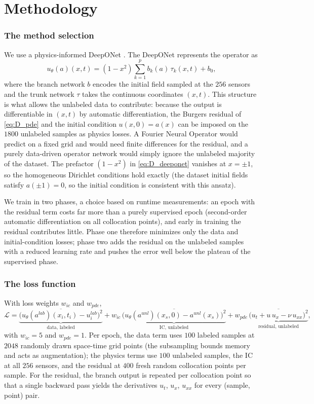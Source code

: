 \section{Methodology}
%
\subsubsection{The method selection}
We use a physics-informed DeepONet \cite{lu2021deeponet, wang2021pideeponet}.
The DeepONet represents the operator as
\begin{equation}
    u_\theta(a)(x,t) = (1 - x^2) \sum_{k=1}^{p} b_k(a)\,\tau_k(x,t) + b_0,
    \label{eq:D_deeponet}
\end{equation}
where the branch network $b$ encodes the initial field sampled at the $256$
sensors and the trunk network $\tau$ takes the continuous coordinates
$(x,t)$. This structure is what allows the unlabeled data to contribute:
because the output is differentiable in $(x,t)$ by automatic
differentiation, the Burgers residual of \eqref{eq:D_pde} and the initial
condition $u(x,0) = a(x)$ can be imposed on the $1800$ unlabeled samples as
physics losses. A Fourier Neural Operator would predict on a fixed grid and
would need finite differences for the residual, and a purely data-driven
operator network would simply ignore the unlabeled majority of the dataset.
The prefactor $(1-x^2)$ in \eqref{eq:D_deeponet} vanishes at $x = \pm1$, so
the homogeneous Dirichlet conditions hold exactly (the dataset initial
fields satisfy $a(\pm1) = 0$, so the initial condition is consistent with
this ansatz).

We train in two phases, a choice based on runtime measurements: an epoch
with the residual term costs far more than a purely supervised epoch
(second-order automatic differentiation on all collocation points), and
early in training the residual contributes little. Phase one therefore
minimizes only the data and initial-condition losses; phase two adds the
residual on the unlabeled samples with a reduced learning rate and pushes
the error well below the plateau of the supervised phase.
%
\subsubsection{The loss function}
With loss weights $w_{ic}$ and $w_{pde}$,
\begin{equation}
    \mathcal{L} =
    \underbrace{\overline{\big(u_\theta(a^{lab})(x_i,t_i) - u^{lab}_i\big)^2}}_{\text{data, labeled}}
    + w_{ic}\,\underbrace{\overline{\big(u_\theta(a^{unl})(x_s,0) - a^{unl}(x_s)\big)^2}}_{\text{IC, unlabeled}}
    + w_{pde}\,\underbrace{\overline{\big(u_t + u\,u_x - \nu\,u_{xx}\big)^2}}_{\text{residual, unlabeled}} ,
\end{equation}
with $w_{ic} = 5$ and $w_{pde} = 1$. Per epoch, the data term uses $100$
labeled samples at $2048$ randomly drawn space-time grid points (the
subsampling bounds memory and acts as augmentation); the physics terms use
$100$ unlabeled samples, the IC at all $256$ sensors, and the residual at
$400$ fresh random collocation points per sample. For the residual, the
branch output is repeated per collocation point so that a single backward
pass yields the derivatives $u_t$, $u_x$, $u_{xx}$ for every
(sample, point) pair.
%

